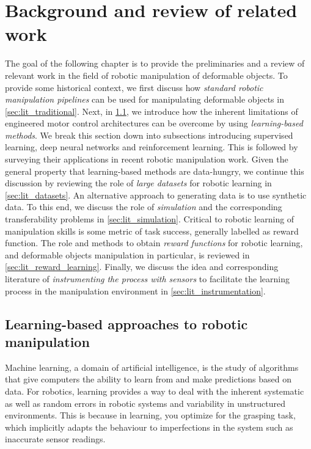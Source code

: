 \documentclass[\home/main.tex]{subfiles}
\begin{document}
\chapter{Background and review of related work} \label{ch:lit}

The goal of the following chapter is to provide the preliminaries and a review of relevant work in the field of robotic manipulation of deformable objects. To provide some historical context, we first discuss how \emph{standard robotic manipulation pipelines} can be used for manipulating deformable objects in \cref{sec:lit_traditional}. Next, in \cref{sec:lit_learning}, we introduce how the inherent limitations of engineered motor control architectures can be overcome by using \emph{learning-based methods}. We break this section down into subsections introducing supervised learning, deep neural networks and reinforcement learning. This is followed by surveying their applications in recent robotic manipulation work. Given the general property that learning-based methods are data-hungry, we continue this discussion by reviewing the role of \emph{large datasets} for robotic learning in \cref{sec:lit_datasets}. An alternative approach to generating data is to use synthetic data. To this end, we discuss the role of \emph{simulation} and the corresponding transferability problems in \cref{sec:lit_simulation}. Critical to robotic learning of manipulation skills is some metric of task success, generally labelled as reward function. The role and methods to obtain \emph{reward functions} for robotic learning, and deformable objects manipulation in particular, is reviewed in \cref{sec:lit_reward_learning}. Finally, we discuss the idea and corresponding literature of \emph{instrumenting the process with sensors} to facilitate the learning process in the manipulation environment in \cref{sec:lit_instrumentation}.



\section{Learning-based approaches to robotic manipulation} \label{sec:lit_learning}

Machine learning, a domain of artificial intelligence, is the study of algorithms that give computers the ability to learn from and make predictions based on data. For robotics, learning provides a way to deal with the inherent systematic as well as random errors in robotic systems and variability in unstructured environments. This is because in learning, you optimize for the grasping task, which implicitly adapts the behaviour to imperfections in the system such as inaccurate sensor readings.
\end{document}
